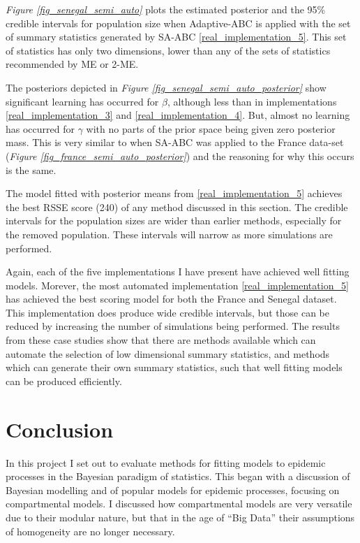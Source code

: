 \documentclass[11pt,a4paper]{article}
\theoremstyle{break}
\begin{document}
  \par \textit{Figure \ref{fig_senegal_semi_auto}} plots the estimated posterior and the 95\% credible intervals for population size when Adaptive-ABC is applied with the set of summary statistics generated by SA-ABC \ref{real_implementation_5}. This set of statistics has only two dimensions, lower than any of the sets of statistics recommended by ME or 2-ME.

  \par The posteriors depicted in \textit{Figure \ref{fig_senegal_semi_auto_posterior}} show significant learning has occurred for $\beta$, although less than in implementations \ref{real_implementation_3} and \ref{real_implementation_4}. But, almost no learning has occurred for $\gamma$ with no parts of the prior space being given zero posterior mass. This is very similar to when SA-ABC was applied to the France data-set (\textit{Figure \ref{fig_france_semi_auto_posterior}}) and the reasoning for why this occurs is the same.

  \par The model fitted with posterior means from \ref{real_implementation_5} achieves the best RSSE score (240) of any method discussed in this section. The credible intervals for the population sizes are wider than earlier methods, especially for the removed population. These intervals will narrow as more simulations are performed.

  \par Again, each of the five implementations I have present have achieved well fitting models. Morever, the most automated implementation \ref{real_implementation_5} has achieved the best scoring model for both the France and Senegal dataset. This implementation does produce wide credible intervals, but those can be reduced by increasing the number of simulations being performed. The results from these case studies show that there are methods available which can automate the selection of low dimensional summary statistics, and methods which can generate their own summary statistics, such that well fitting models can be produced efficiently.

\newpage
\section{Conclusion}\label{sec_conclusion}

  \par In this project I set out to evaluate methods for fitting models to epidemic processes in the Bayesian paradigm of statistics. This began with a discussion of Bayesian modelling and of popular models for epidemic processes, focusing on compartmental models. I discussed how compartmental models are very versatile due to their modular nature, but that in the age of ``Big Data'' their assumptions of homogeneity are no longer necessary.
\end{document}

